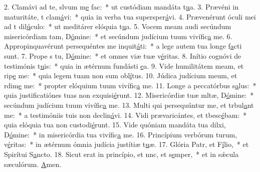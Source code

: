 2. Clamávi ad te, slvum m\uline{e} fac:~* ut custódiam mandáta t\uline{u}a.
3. Prævéni in maturitáte, t clam\uline{á}vi:~* quia in verba tua supersper\uline{á}vi.
4. Prævenérunt óculi mei ad t dil\uline{ú}culo:~* ut meditárer elóquia t\uline{u}a.
5. Vocem meam audi secúndum misericórdiam tam, D\uline{ó}mine:~* et secúndum judícium tuum vivífic\uline{a} me.
6. Appropinquavérunt persequéntes me inquit\uline{á}ti:~* a lege autem tua longe f\uline{a}cti sunt.
7. Prope s tu, D\uline{ó}mine:~* et omnes viæ tuæ v\uline{é}ritas.
8. Inítio cognóvi de testimónis t\uline{u}is:~* quia in ætérnum fundásti \uline{e}a.
9. Vide humilitátem meam, et rip\uline{e} me:~* quia legem tuam non sum obl\uline{í}tus.
10. Júdica judícium meum, et rdim\uline{e} me:~* propter elóquium tuum vivífic\uline{a} me.
11. Longe a peccatórbus s\uline{a}lus:~* quia justificatiónes tuas non exquisi\uline{é}runt.
12. Misericórdiæ tuæ mltæ, D\uline{ó}mine:~* secúndum judícium tuum vivífic\uline{a} me.
13. Multi qui persequúntur me, et trbul\uline{a}nt me:~* a testimóniis tuis non declin\uline{á}vi.
14. Vidi prævaricántes, et tbesc\uline{é}bam:~* quia elóquia tua non custodi\uline{é}runt.
15. Vide quóniam mandáta tua dilxi, D\uline{ó}mine:~* in misericórdia tua vivífic\uline{a} me.
16. Princípium verbórum turum, v\uline{é}ritas:~* in ætérnum ómnia judícia justítiæ t\uline{u}æ.
17. Glória Patr, et F\uline{í}lio,~* et Spirítui S\uline{a}ncto.
18. Sicut erat in princípio, et nnc, et s\uline{e}mper,~* et in sǽcula sæculórum. \uline{A}men.
